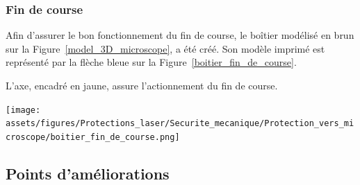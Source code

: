 \subsubsection{Fin de course}
\begin{minipage}[c]{0.48\textwidth}
    Afin d'assurer le bon fonctionnement du fin de course, le boîtier modélisé en \textcolor[RGB]{120, 70, 30}{brun} sur la Figure~\ref{model_3D_microscope}, a été créé. Son modèle imprimé est représenté par la flèche \textcolor[RGB]{115, 210, 210}{bleue} sur la Figure~\ref{boitier_fin_de_course}.

    \vspace{1em}
    L'axe, encadré en \textcolor[RGB]{233, 173, 56}{jaune}, assure l'actionnement du fin de course.

\end{minipage}\hfill
\begin{minipage}[c]{0.48\textwidth}
    \begin{center}
        \texttt{[image: assets/figures/Protections\_laser/Securite\_mecanique/Protection\_vers\_microscope/boitier\_fin\_de\_course.png]}
    \end{center}
    \label{boitier_fin_de_course}
\end{minipage}

\subsection{Points d'améliorations}